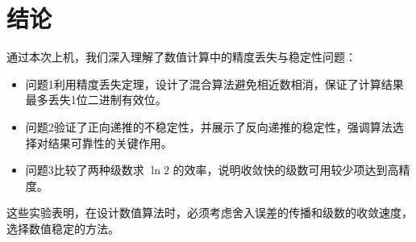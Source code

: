 \documentclass{article}
\begin{document}
\section{结论}
通过本次上机，我们深入理解了数值计算中的精度丢失与稳定性问题：
\begin{itemize}
    \item 问题1利用精度丢失定理，设计了混合算法避免相近数相消，保证了计算结果最多丢失1位二进制有效位。
    \item 问题2验证了正向递推的不稳定性，并展示了反向递推的稳定性，强调算法选择对结果可靠性的关键作用。
    \item 问题3比较了两种级数求 \(\ln 2\) 的效率，说明收敛快的级数可用较少项达到高精度。
\end{itemize}
这些实验表明，在设计数值算法时，必须考虑舍入误差的传播和级数的收敛速度，选择数值稳定的方法。

\newpage
\end{document}
